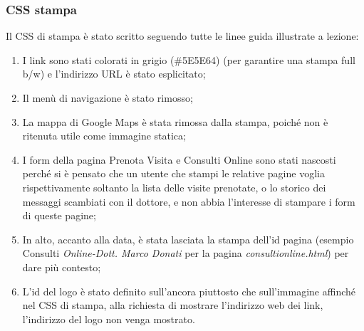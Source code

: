 \begin{center}
\end{center}

\bigskip

\subsubsection{CSS stampa}
Il CSS  di stampa è stato scritto seguendo tutte le linee guida illustrate a lezione:
\begin{enumerate}
\item I link sono stati colorati in grigio (\#5E5E64) (per garantire una stampa full b/w) e l’indirizzo URL è stato esplicitato;
\item Il menù di navigazione è stato rimosso;
\item La mappa di Google Maps è stata rimossa dalla stampa, poiché non è ritenuta utile come immagine statica;
\item I form della pagina Prenota Visita e Consulti Online sono stati nascosti perché si è pensato che un utente che stampi le relative pagine voglia rispettivamente soltanto la lista delle visite prenotate, o lo storico dei messaggi scambiati con il dottore, e non abbia l'interesse di stampare i form di queste pagine;
\item In alto, accanto alla data, è stata lasciata la stampa dell’id pagina (esempio Consulti \textit{Online-Dott. Marco Donati} per la pagina \textit{consultionline.html}) per dare più contesto;
\item L'id del logo è stato definito sull'ancora piuttosto che sull'immagine affinché nel CSS di stampa, alla richiesta di mostrare l’indirizzo web dei link, l’indirizzo del logo non venga mostrato. \\
\end{enumerate}

